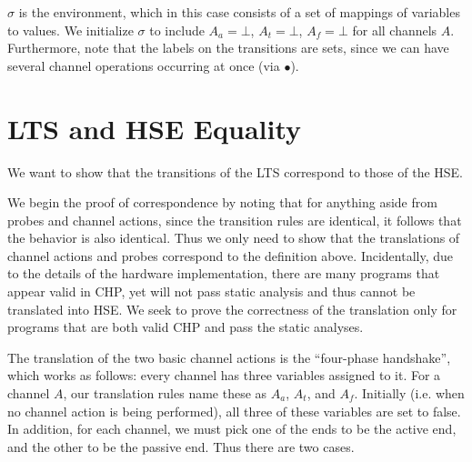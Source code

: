 \documentclass[times, 10pt]{article}
\begin{document}
$\sigma$ is the environment, which in this case consists of a set of mappings of
variables to values.  We initialize $\sigma$ to include $A_a = \bot$, $A_t =
\bot$, $A_f = \bot$ for all channels $A$.  Furthermore, note that the labels on
the transitions are sets, since we can have several channel operations occurring
at once (via $\bullet$).

\section{LTS and HSE Equality}

We want to show that the transitions of the LTS correspond to those of the HSE.

We begin the proof of correspondence by noting that for anything aside from
probes and channel actions, since the transition rules are identical, it follows
that the behavior is also identical. Thus we only need to show that the
translations of channel actions and probes correspond to the definition above.
Incidentally, due to the details of the hardware implementation, there are many
programs that appear valid in CHP, yet will not pass static analysis and thus
cannot be translated into HSE. We seek to prove the correctness of the
translation only for programs that are both valid CHP and pass the static
analyses.

The translation of the two basic channel actions is the ``four-phase
handshake'', which works as follows: every channel has three variables assigned
to it. For a channel $A$, our translation rules name these as $A_a$, $A_t$, and
$A_f$. Initially (i.e. when no channel action is being performed), all three of
these variables are set to false. In addition, for each channel, we must pick
one of the ends to be the active end, and the other to be the passive end. Thus
there are two cases.
\end{document}
